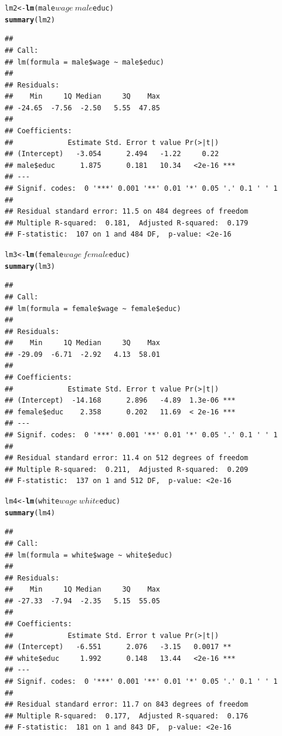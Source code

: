 \documentclass[a4paper]{article}\usepackage{graphicx, color}
\makeatletter
\newcommand{\hlfunctioncall}[1]{\textcolor[rgb]{0.501960784313725,0,0.329411764705882}{\textbf{#1}}}%
\newenvironment{kframe}{%
 \def\at@end@of@kframe{}%
 \ifinner\ifhmode%
  \def\at@end@of@kframe{\end{minipage}}%
  \begin{minipage}{\columnwidth}%
 \fi\fi%
 \def\FrameCommand##1{\hskip\@totalleftmargin \hskip-\fboxsep
 \colorbox{shadecolor}{##1}\hskip-\fboxsep
     \hskip-\linewidth \hskip-\@totalleftmargin \hskip\columnwidth}%
 \MakeFramed {\advance\hsize-\width
   \@totalleftmargin\z@ \linewidth\hsize
   \@setminipage}}%
 {\par\unskip\endMakeFramed%
 \at@end@of@kframe}
\newenvironment{knitrout}{}{} %
\makeatother
\begin{document}
\begin{knitrout}
\begin{kframe}
\begin{alltt}
lm2 <- \hlfunctioncall{lm}(male$wage ~ male$educ)
\hlfunctioncall{summary}(lm2)
\end{alltt}
\begin{verbatim}
## 
## Call:
## lm(formula = male$wage ~ male$educ)
## 
## Residuals:
##    Min     1Q Median     3Q    Max 
## -24.65  -7.56  -2.50   5.55  47.85 
## 
## Coefficients:
##             Estimate Std. Error t value Pr(>|t|)    
## (Intercept)   -3.054      2.494   -1.22     0.22    
## male$educ      1.875      0.181   10.34   <2e-16 ***
## ---
## Signif. codes:  0 '***' 0.001 '**' 0.01 '*' 0.05 '.' 0.1 ' ' 1
## 
## Residual standard error: 11.5 on 484 degrees of freedom
## Multiple R-squared:  0.181,	Adjusted R-squared:  0.179 
## F-statistic:  107 on 1 and 484 DF,  p-value: <2e-16
\end{verbatim}
\begin{alltt}

lm3 <- \hlfunctioncall{lm}(female$wage ~ female$educ)
\hlfunctioncall{summary}(lm3)
\end{alltt}
\begin{verbatim}
## 
## Call:
## lm(formula = female$wage ~ female$educ)
## 
## Residuals:
##    Min     1Q Median     3Q    Max 
## -29.09  -6.71  -2.92   4.13  58.01 
## 
## Coefficients:
##             Estimate Std. Error t value Pr(>|t|)    
## (Intercept)  -14.168      2.896   -4.89  1.3e-06 ***
## female$educ    2.358      0.202   11.69  < 2e-16 ***
## ---
## Signif. codes:  0 '***' 0.001 '**' 0.01 '*' 0.05 '.' 0.1 ' ' 1
## 
## Residual standard error: 11.4 on 512 degrees of freedom
## Multiple R-squared:  0.211,	Adjusted R-squared:  0.209 
## F-statistic:  137 on 1 and 512 DF,  p-value: <2e-16
\end{verbatim}
\begin{alltt}

lm4 <- \hlfunctioncall{lm}(white$wage ~ white$educ)
\hlfunctioncall{summary}(lm4)
\end{alltt}
\begin{verbatim}
## 
## Call:
## lm(formula = white$wage ~ white$educ)
## 
## Residuals:
##    Min     1Q Median     3Q    Max 
## -27.33  -7.94  -2.35   5.15  55.05 
## 
## Coefficients:
##             Estimate Std. Error t value Pr(>|t|)    
## (Intercept)   -6.551      2.076   -3.15   0.0017 ** 
## white$educ     1.992      0.148   13.44   <2e-16 ***
## ---
## Signif. codes:  0 '***' 0.001 '**' 0.01 '*' 0.05 '.' 0.1 ' ' 1
## 
## Residual standard error: 11.7 on 843 degrees of freedom
## Multiple R-squared:  0.177,	Adjusted R-squared:  0.176 
## F-statistic:  181 on 1 and 843 DF,  p-value: <2e-16
\end{verbatim}
\begin{alltt}


\end{alltt}
\end{kframe}
\end{knitrout}
\end{document}
